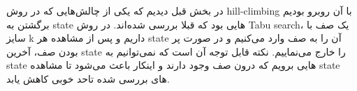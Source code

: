 در بخش قبل دیدیم که یکی از چالش‌هایی که در روش hill-climbing با آن روبرو بودیم برگشتن به state هایی بود که قبلا بررسی شده‌اند.
در روش Tabu search، یک صف با سایز k داریم و پس از مشاهده هر state آن را به صف وارد می‌کنیم و در صورت پر بودن صف، آخرین state را خارج می‌نماییم.
نکته قابل توجه آن است که نمی‌توانیم به state هایی برویم که درون صف وجود دارند و اینکار باعث می‌شود تا مشاهده state های بررسی شده تاحد خوبی کاهش یابد.

